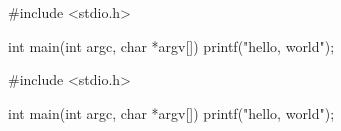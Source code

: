 \documentclass{article}
\begin{document}
\begin{lstquestion}[pre=Consider the following C program.,points=6]
#include <stdio.h>

int main(int argc, char *argv[]) {
  printf("hello, world\n");
}
\end{lstquestion}

\begin{lstsolution}[pre=Consider the following C program.]
#include <stdio.h>

int main(int argc, char *argv[]) {
  printf("hello, world\n");
}
\end{lstsolution}

\printsolutions 
\end{document}
